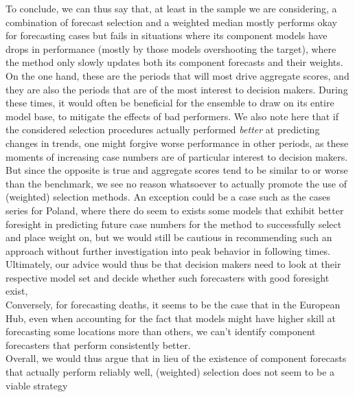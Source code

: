 To conclude, we can thus say that, at least in the sample we are considering, a combination of forecast selection and a weighted median mostly performs okay for forecasting cases but fails in situations where its component models have drops in performance (mostly by those models overshooting the target), where the method only slowly updates both its component forecasts and their weights. On the one hand, these are the periods that will most drive aggregate scores, and they are also the periods that are of the most interest to decision makers. During these times, it would often be beneficial for the ensemble to draw on its entire model base, to mitigate the effects of bad performers. We also note here that if the considered selection procedures actually performed \textit{better} at predicting changes in trends, one might forgive worse performance in other periods, as these moments of increasing case numbers are of particular interest to decision makers. But since the opposite is true and aggregate scores tend to be similar to or worse than the benchmark, we see no reason whatsoever to actually promote the use of (weighted) selection methods. An exception could be a case such as the cases series for Poland, where there do seem to exists some models that exhibit better foresight in predicting future case numbers for the method to successfully select and place weight on, but we would still be cautious in recommending such an approach without further investigation into peak behavior in following times. Ultimately, our advice would thus be that decision makers need to look at their respective model set and decide whether such forecasters with good foresight exist,\medskip\\ 
Conversely, for forecasting deaths, it seems to be the case that in the European Hub, even when accounting for the fact that models might have higher skill at forecasting some locations more than others, we can't identify component forecasters that perform consistently better.\\ 
Overall, we would thus argue that in lieu of the existence of component forecasts that actually perform reliably well, (weighted) selection does not seem to be a viable strategy\\
